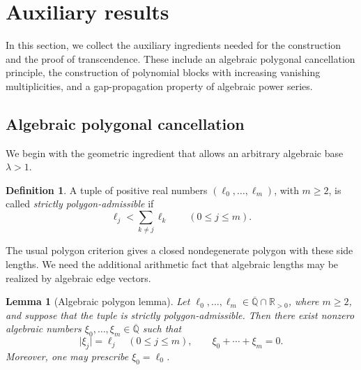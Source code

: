 \documentclass[10pt]{amsart}
\newtheorem{lemma}[theorem]{Lemma}
\theoremstyle{definition}
\newtheorem{definition}[theorem]{Definition}
\theoremstyle{remark}
\numberwithin{equation}{section}
\newcommand{\R}{\mathbb R}
\newcommand{\Qbar}{\overline{\mathbb Q}}
\newcommand{\abs}[1]{\lvert #1\rvert}
\begin{document}
\section{Auxiliary results}

In this section, we collect the auxiliary ingredients needed for the
construction and the proof of transcendence. These include an algebraic
polygonal cancellation principle, the construction of polynomial blocks
with increasing vanishing multiplicities, and a gap-propagation property
of algebraic power series.

\subsection{Algebraic polygonal cancellation}

We begin with the geometric ingredient that allows an arbitrary algebraic
base $\lambda>1$.

\begin{definition}
A tuple of positive real numbers $(\ell_0,\ldots,\ell_m)$, with $m\geq2$,
is called \emph{strictly polygon-admissible} if
\begin{equation}\label{eq:polygon-inequalities}
        \ell_j<\sum_{k\neq j}\ell_k
        \qquad(0\leq j\leq m).
\end{equation}
\end{definition}

The usual polygon criterion gives a closed nondegenerate polygon with these
side lengths. We need the additional arithmetic fact that algebraic lengths
may be realized by algebraic edge vectors.

\begin{lemma}[Algebraic polygon lemma]\label{lemma:algebraic-polygon}
Let $\ell_0,\ldots,\ell_m\in\Qbar\cap\R_{>0}$, where $m\geq2$, and suppose
that the tuple is strictly polygon-admissible. Then there exist nonzero
algebraic numbers $\xi_0,\ldots,\xi_m\in\Qbar$ such that
\[
        \abs{\xi_j}=\ell_j\quad(0\leq j\leq m),
        \qquad
        \xi_0+\cdots+\xi_m=0.
\]
Moreover, one may prescribe $\xi_0=\ell_0$.
\end{lemma}
\end{document}
